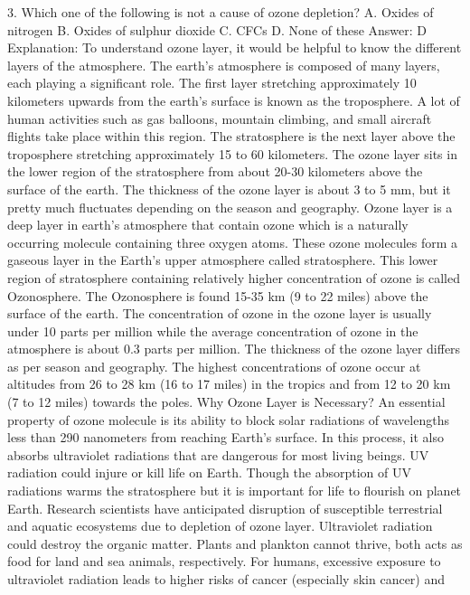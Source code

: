 3. Which one of the following is not a cause of ozone depletion?
A. Oxides of nitrogen
B. Oxides of sulphur dioxide
C. CFCs
D. None of these
Answer: D
Explanation: To understand ozone layer, it would be helpful to know
the different layers of the atmosphere. The earth’s atmosphere is
composed of many layers, each playing a significant role. The first
layer stretching approximately 10 kilometers upwards from the
earth’s surface is known as the troposphere. A lot of human
activities such as gas balloons, mountain climbing, and small aircraft
flights take place within this region.
The stratosphere is the next layer above the troposphere
stretching approximately 15 to 60 kilometers. The ozone layer sits in
the lower region of the stratosphere from about 20-30 kilometers
above the surface of the earth. The thickness of the ozone layer is
about 3 to 5 mm, but it pretty much fluctuates depending on the
season and geography.
Ozone layer is a deep layer in earth’s atmosphere that contain ozone
which is a naturally occurring molecule containing three oxygen
atoms. These ozone molecules form a gaseous layer in the Earth’s
upper atmosphere called stratosphere. This lower region of
stratosphere containing relatively higher concentration of ozone is
called Ozonosphere. The Ozonosphere is found 15-35 km (9 to 22
miles) above the surface of the earth.
The concentration of ozone in the ozone layer is usually under 10
parts per million while the average concentration of ozone in the
atmosphere is about 0.3 parts per million. The thickness of the
ozone layer differs as per season and geography. The highest
concentrations of ozone occur at altitudes from 26 to 28 km (16 to
17 miles) in the tropics and from 12 to 20 km (7 to 12 miles) towards
the poles.
Why Ozone Layer is Necessary?
An essential property of ozone molecule is its ability to block solar
radiations of wavelengths less than 290 nanometers from reaching
Earth’s surface. In this process, it also absorbs ultraviolet
radiations that are dangerous for most living beings. UV radiation
could injure or kill life on Earth. Though the absorption of UV
radiations warms the stratosphere but it is important for life to
flourish on planet Earth. Research scientists have anticipated
disruption of susceptible terrestrial and aquatic ecosystems due to
depletion of ozone layer.
Ultraviolet radiation could destroy the organic matter. Plants and
plankton cannot thrive, both acts as food for land and sea animals,
respectively. For humans, excessive exposure to ultraviolet radiation
leads to higher risks of cancer (especially skin cancer) and
